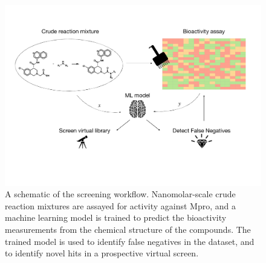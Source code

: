 
\begin{figure}[!t]
    \centering
    \includegraphics[width=\textwidth]{Chapters/Crude/Figs/schematic.pdf}
    \caption{A schematic of the screening workflow. Nanomolar-scale crude reaction mixtures are assayed for activity against Mpro, and a machine learning model is trained to predict the bioactivity measurements from the chemical structure of the compounds. The trained model is used to identify false negatives in the dataset, and to identify novel hits in a prospective virtual screen.}
    \label{fig:schematic}
\end{figure}

